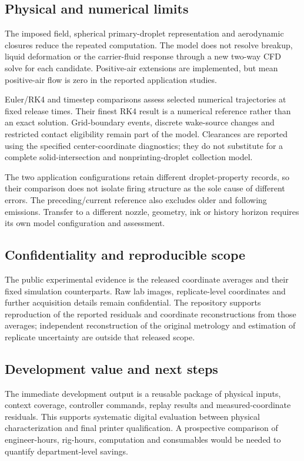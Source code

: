 \subsection{Physical and numerical limits}
The imposed field, spherical primary-droplet representation and aerodynamic closures reduce the repeated computation. The model does not resolve breakup, liquid deformation or the carrier-fluid response through a new two-way CFD solve for each candidate. Positive-air extensions are implemented, but mean positive-air flow is zero in the reported application studies.

Euler/RK4 and timestep comparisons assess selected numerical trajectories at fixed release times. Their finest RK4 result is a numerical reference rather than an exact solution. Grid-boundary events, discrete wake-source changes and restricted contact eligibility remain part of the model. Clearances are reported using the specified center-coordinate diagnostics; they do not substitute for a complete solid-intersection and nonprinting-droplet collection model.

The two application configurations retain different droplet-property records, so their comparison does not isolate firing structure as the sole cause of different errors. The preceding/current reference also excludes older and following emissions. Transfer to a different nozzle, geometry, ink or history horizon requires its own model configuration and assessment.

\subsection{Confidentiality and reproducible scope}
The public experimental evidence is the released coordinate averages and their fixed simulation counterparts. Raw lab images, replicate-level coordinates and further acquisition details remain confidential. The repository supports reproduction of the reported residuals and coordinate reconstructions from those averages; independent reconstruction of the original metrology and estimation of replicate uncertainty are outside that released scope.

\subsection{Development value and next steps}
The immediate development output is a reusable package of physical inputs, context coverage, controller commands, replay results and measured-coordinate residuals. This supports systematic digital evaluation between physical characterization and final printer qualification. A prospective comparison of engineer-hours, rig-hours, computation and consumables would be needed to quantify department-level savings.

